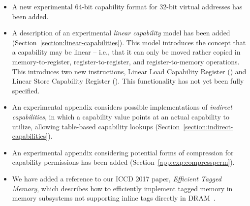 \begin{itemize}
\item A new experimental 64-bit capability format for 32-bit virtual addresses
has been added.

\item A description of an experimental {\it linear capability} model has been
added (Section~\ref{section:linear-capabilities}).
This model introduces the concept that a capability may be linear -- i.e.,
that it can only be moved rather copied in memory-to-register,
register-to-register, and register-to-memory operations.
This introduces two new instructions, Linear Load Capability Register
() and Linear Store Capability Register
().
This functionality has not yet been fully specified.

\item An experimental appendix considers possible implementations of {\it
indirect capabilities}, in which a capability value points at an actual
capability to utilize, allowing table-based capability lookups
(Section~\ref{section:indirect-capabilities}).

\item An experimental appendix considering potential forms of compression for
capability permissions has been added (Section~\ref{app:exp:compressperm}).

\item We have added a reference to our ICCD 2017 paper, \textit{Efficient
Tagged Memory}, which describes how to efficiently implement tagged memory in
memory subsystems not supporting inline tags directly in
  DRAM~\cite{joannou2017:tagged-memory}.
\end{itemize}
